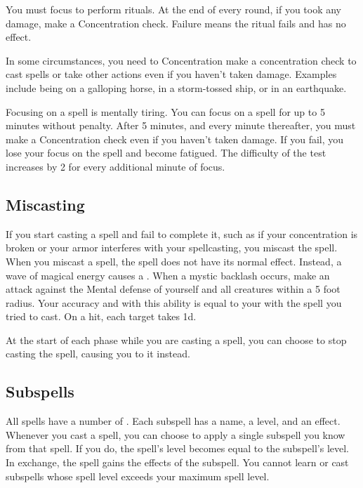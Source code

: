          You must focus to perform rituals.
        At the end of every round, if you took any damage, make a Concentration check.
        Failure means the ritual fails and has no effect.

         In some circumstances, you need to Concentration make a concentration check to cast spells or take other actions even if you haven't taken damage.
        Examples include being on a galloping horse, in a storm-tossed ship, or in an earthquake.

         Focusing on a spell is mentally tiring.
        You can focus on a spell for up to 5 minutes without penalty.
        After 5 minutes, and every minute thereafter, you must make a Concentration check even if you haven't taken damage.
        If you fail, you lose your focus on the spell and become fatigued.
        The difficulty of the test increases by 2 for every additional minute of focus.

    \subsection{Miscasting}\label{Miscasting}

        If you start casting a spell and fail to complete it, such as if your concentration is broken or your armor interferes with your spellcasting, you miscast the spell.
        When you miscast a spell, the spell does not have its normal effect.
        Instead, a wave of magical energy causes a .
        When a mystic backlash occurs, make an attack against the Mental defense of yourself and all creatures within a 5 foot radius.
        Your accuracy and  with this ability is equal to your  with the spell you tried to cast.
        On a hit, each target takes  \minus1d.

         At the start of each phase while you are casting a spell, you can choose to stop casting the spell, causing you to  it instead.

    \subsection{Subspells}\label{Subspells}
        All spells have a number of .
        Each subspell has a name, a level, and an effect.
        Whenever you cast a spell, you can choose to apply a single subspell you know from that spell.
        If you do, the spell's level becomes equal to the subspell's level.
        In exchange, the spell gains the effects of the subspell.
        You cannot learn or cast subspells whose spell level exceeds your maximum spell level.

